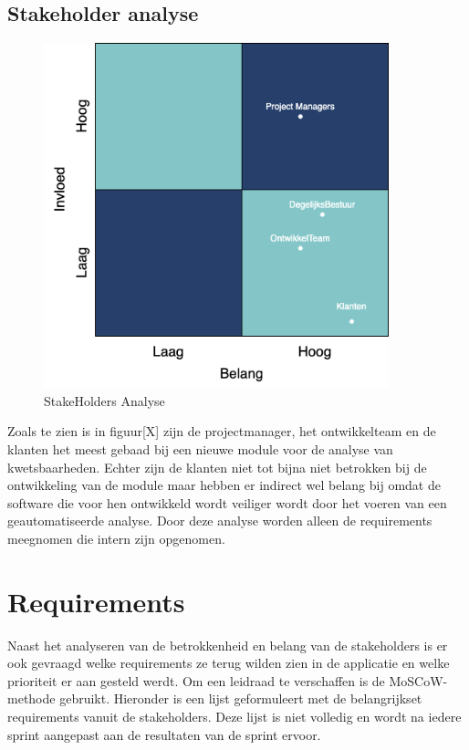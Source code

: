 \subsection{Stakeholder analyse}
\begin{figure}[bth]
\myfloatalign
\includegraphics[width=10cm]{gfx/stakeholderanalyse}
\caption{StakeHolders Analyse}
\label{fig:StakeholderAnalyse}
\end{figure}
Zoals te zien is in figuur[X] zijn de projectmanager, het ontwikkelteam en de klanten het meest gebaad bij een nieuwe module voor de analyse van kwetsbaarheden. Echter zijn de klanten niet tot bijna niet betrokken bij de ontwikkeling van de module maar hebben er indirect wel belang bij omdat de software die voor hen ontwikkeld wordt veiliger wordt door het voeren van een geautomatiseerde analyse. Door deze analyse worden alleen de requirements meegnomen die intern zijn opgenomen.
\section{Requirements}
Naast het analyseren van de betrokkenheid en belang van de stakeholders is er ook gevraagd welke requirements ze terug wilden zien in de applicatie en welke prioriteit er aan gesteld werdt. Om een leidraad te verschaffen is de MoSCoW-methode gebruikt. Hieronder is een lijst geformuleert met de belangrijkset requirements vanuit de stakeholders. Deze lijst is niet volledig en wordt na iedere sprint aangepast aan de resultaten van de sprint ervoor.\\

